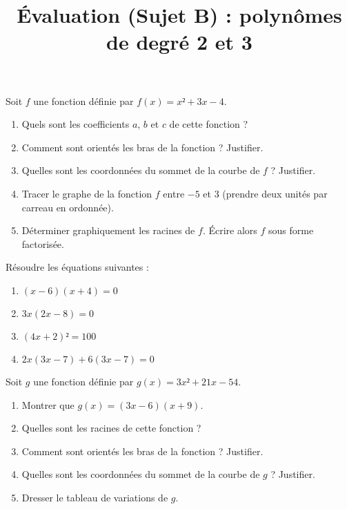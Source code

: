 \documentclass[
	classe=$1^{ere}STI2D$,
	headerTitle=Évaluation\space Chapitre\space 4
]{évaluation}
\begin{document}
\begin{exercice}
	Soit $f$ une fonction définie par $f(x) = x² + 3x - 4$.
	\begin{enumerate}
		\item Quels sont les coefficients $a$, $b$ et $c$ de cette fonction ?
		\item Comment sont orientés les bras de la fonction ? Justifier.
		\item Quelles sont les coordonnées du sommet de la courbe de $f$ ? Justifier.
		\item Tracer le graphe de la fonction $f$ entre $-5$ et $3$ (prendre deux unités par carreau en ordonnée).
		\item Déterminer graphiquement les racines de $f$. Écrire alors $f$ sous forme factorisée.
	\end{enumerate}
\end{exercice}

\begin{exercice}
	Résoudre les équations suivantes :
	\begin{enumerate}
		\item $(x - 6)(x + 4) = 0$
		\item $3x(2x - 8) = 0$
		\item $(4x + 2)² = 100$
		\item $2x(3x - 7) + 6(3x - 7) = 0$
	\end{enumerate}
\end{exercice}

\begin{exercice}
	Soit $g$ une fonction définie par $g(x) = 3x² + 21x - 54$.
	\begin{enumerate}
		\item Montrer que $g(x) = (3x - 6)(x + 9)$.
		\item Quelles sont les racines de cette fonction ?
		\item Comment sont orientés les bras de la fonction ? Justifier.
		\item Quelles sont les coordonnées du sommet de la courbe de $g$ ? Justifier.
		\item Dresser le tableau de variations de $g$.
	\end{enumerate}
\end{exercice}

\newpage
\setcounter{exercice}{1}

\title{Évaluation (Sujet B) : polynômes de degré 2 et 3}
\maketitle
\end{document}
